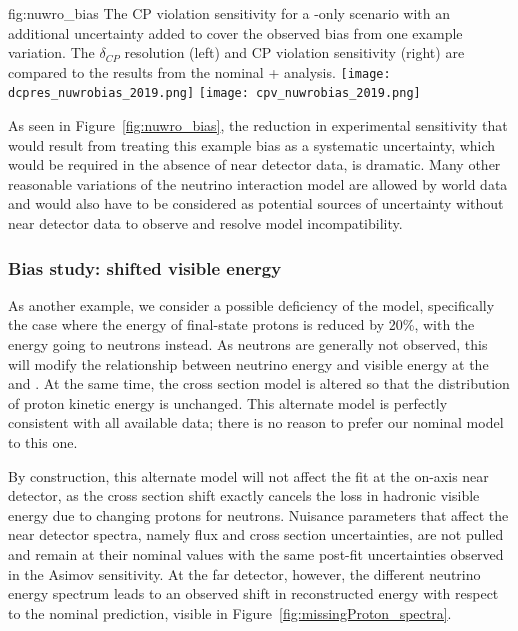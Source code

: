 \begin{dunefigure}{fig:nuwro_bias}
{The CP violation sensitivity for a -only scenario with an additional uncertainty added to cover the observed bias from one example variation. The $\delta_{CP}$ resolution (left) and CP violation sensitivity (right) are compared to the results from the nominal + analysis.}
  \texttt{[image: dcpres\_nuwrobias\_2019.png]}
  \texttt{[image: cpv\_nuwrobias\_2019.png]}
\end{dunefigure}

As seen in Figure~\ref{fig:nuwro_bias}, the reduction in experimental sensitivity that would result from treating this example bias as a systematic uncertainty, which would be required in the absence of near detector data, is dramatic. Many other reasonable variations of the neutrino interaction model are allowed by world data and would also have to be considered as potential sources of uncertainty without near detector data to observe and resolve model incompatibility. 

\subsubsection{Bias study: shifted visible energy}
\label{sec:missingProtonMD}

As another example, we consider a possible deficiency of the  model, specifically the case where the energy of final-state protons is reduced by 20\%, with the energy going to neutrons instead. As neutrons are generally not observed, this will modify the relationship between neutrino energy and visible energy at the  and . At the same time, the cross section model is altered so that the distribution of proton kinetic energy is unchanged. This alternate model is perfectly consistent with all available data; there is no reason to prefer our nominal  model to this one.

By construction, this alternate model will not affect the fit at the on-axis near detector, as the cross section shift exactly cancels the loss in hadronic visible energy due to changing protons for neutrons. Nuisance parameters that affect the near detector spectra, namely flux and cross section uncertainties, are not pulled and remain at their nominal values with the same post-fit uncertainties observed in the Asimov sensitivity. At the far detector, however, the different neutrino energy spectrum leads to an observed shift in reconstructed energy with respect to the nominal prediction, visible in Figure~\ref{fig:missingProton_spectra}.

